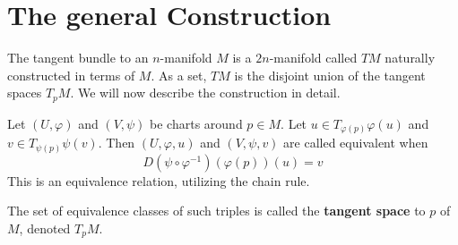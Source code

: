 \section{The general Construction}
The tangent bundle to an $n$-manifold $M$ is a $2n$-manifold called
$TM$ naturally constructed in terms of $M$. As a set, $TM$ is the
disjoint union of the tangent spaces $T_p M$. We will now describe 
the construction in detail.

\begin{definition}
Let $(U,\varphi)$ and $(V,\psi)$ be charts around $p \in M$.
Let $u \in T_{\varphi(p)}\varphi(u)$ and $v\in T_{\psi(p)}\psi(v)$.
Then $(U,\varphi, u)$ and $(V, \psi, v)$ are called equivalent when
\[
D(\psi \circ \varphi^{-1})(\varphi(p))(u) = v
\]
This is an equivalence relation, utilizing the chain rule.

The set of equivalence classes of such triples is called the 
\textbf{tangent space} to $p$ of $M$, denoted $T_p M$.
\end{definition}
